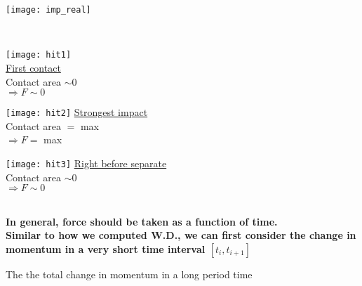 \documentclass[class=article, crop=false, 12pt]{standalone}
\begin{document}
\begin{center}
    \begin{minipage}{0.4\linewidth}
        \centering
        \texttt{[image: imp\_real]}
    \end{minipage}
    \begin{minipage}{0.4\linewidth}
        \centering
    \end{minipage}
    \\[1em]
    \begin{minipage}{0.3\linewidth}
        \centering
        \texttt{[image: hit1]}\\
        \ul{First contact} \\
        Contact area $\sim 0$ \\
        $\Rightarrow F\sim 0$ 
    \end{minipage}
    \begin{minipage}{0.3\linewidth}
        \centering
        \texttt{[image: hit2]}
        \ul{Strongest impact} \\
        Contact area $=$ max \\
        $\Rightarrow F= $ max 
    \end{minipage}
    \begin{minipage}{0.3\linewidth}
        \centering
        \texttt{[image: hit3]}
        \ul{Right before separate} \\
        Contact area $\sim 0$ \\
        $\Rightarrow F\sim 0$ 
    \end{minipage}
\end{center}

\hfill \\
\bf{In general, force should be taken as a function of time.} \\

Similar to how we computed W.D., 
we can first consider the change in momentum in a very short time interval $[t_i, t_{i+1}]$

The the total change in momentum in a long period time 
\end{document}

